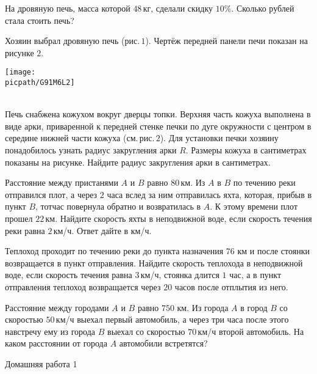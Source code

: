 \begin{class}[number=2]
\begin{listofex}
		\item На дровяную печь, масса которой \( 48 \) кг, сделали скидку \( 10\% \). Сколько рублей стала стоить печь?
		\item Хозяин выбрал дровяную печь (рис. \( 1 \)). Чертёж передней панели печи показан на рисунке \( 2 \).
		\begin{minipage}[c]{0.35\textwidth}
			\texttt{[image: \\picpath/G91M6L2]}
		\end{minipage}\\
		Печь снабжена кожухом вокруг дверцы топки. Верхняя часть кожуха выполнена в виде арки, приваренной к передней стенке печки по дуге окружности с центром в середине нижней части кожуха (см. рис. \( 2 \)). Для установки печки хозяину понадобилось узнать радиус закругления арки \( R \). Размеры кожуха в сантиметрах показаны на рисунке. Найдите радиус закругления арки в сантиметрах.
		\item Расстояние между пристанями \( A \) и \( B \) равно \( 80 \) км. Из \( A \) в \( B \) по течению реки отправился плот, а через \( 2 \) часа вслед за ним отправилась яхта, которая, прибыв в пункт \( B \), тотчас повернула обратно и возвратилась в \( A \). К этому времени плот прошел \( 22 \) км. Найдите скорость яхты в неподвижной воде, если скорость течения реки равна \( 2 \) км/ч. Ответ дайте в км/ч.
		\item Теплоход проходит по течению реки до пункта назначения \( 76  \) км и после стоянки возвращается в пункт отправления. Найдите скорость теплохода в неподвижной воде, если скорость течения равна \( 3 \) км/ч, стоянка длится \( 1 \) час, а в пункт отправления теплоход возвращается через \( 20 \) часов после отплытия из него.
		\item Расстояние между городами \( A \) и \( B \) равно \( 750  \) км. Из города \( A \) в город \( B \) со скоростью \( 50 \) км/ч выехал первый автомобиль, а через три часа после этого навстречу ему из города \( B \) выехал со скоростью \( 70 \) км/ч второй автомобиль. На каком расстоянии от города \( A \) автомобили встретятся?		
	\end{listofex}
\end{class}

\begin{homework}[number=1]
	\begin{listofex}
		\item Домашняя работа 1
	\end{listofex}
\end{homework}

